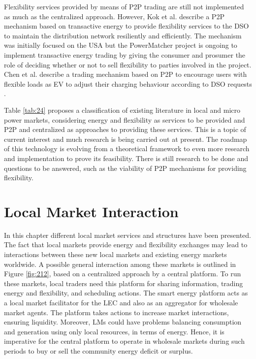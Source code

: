 Flexibility services provided by means of P2P trading are still not implemented as much as the centralized approach. However, Kok et al. \cite{kok2016society} describe a P2P mechanism based on transactive energy to provide flexibility services to the DSO to maintain the distribution network resiliently and efficiently. The mechanism was initially focused on the USA but the PowerMatcher project is ongoing to implement transactive energy trading by giving the consumer and prosumer the role of deciding whether or not to sell flexibility to parties involved in the project. Chen et al. describe a trading mechanism based on P2P to encourage users with flexible loads as EV to adjust their charging behaviour according to DSO requests \cite{chen2017integrated}.

Table \ref{tab:24} proposes a classification of existing literature in local and micro power markets, considering energy and flexibility as services to be provided and P2P and centralized as approaches to providing these services. This is a topic of current interest and much research is being carried out at present. The roadmap of this technology is evolving from a theoretical framework to even more research and implementation to prove its feasibility. There is still research to be done and questions to be answered, such as the viability of P2P mechanisms for providing flexibility.

\section{Local Market Interaction} \label{sec:interaction}
In this chapter different local market services and structures have been presented. The fact that local markets provide energy and flexibility exchanges may lead to interactions between these new local markets and existing energy markets worldwide. A possible general interaction among these markets is outlined in Figure \ref{fig:212}, based on a centralized approach by a central platform. To run these markets, local traders need this platform for sharing information, trading energy and flexibility, and scheduling actions. The smart energy platform acts as a local market facilitator for the LEC and also as an aggregator for wholesale market agents. The platform takes actions to increase market interactions, ensuring liquidity. Moreover, LMs could have problems balancing consumption and generation using only local resources, in terms of energy. Hence, it is imperative for the central platform to operate in wholesale markets during such periods to buy or sell the community energy deficit or surplus.

